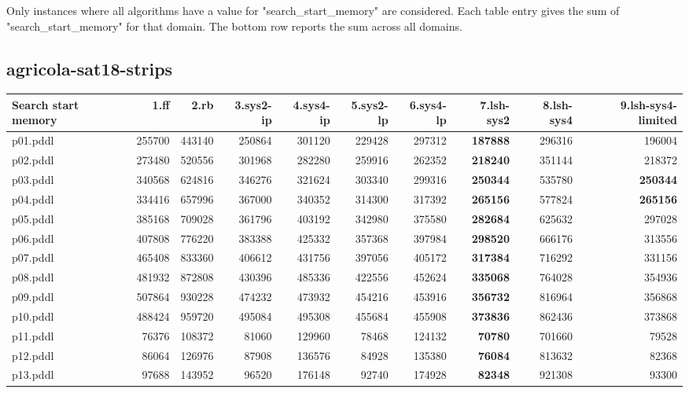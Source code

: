 \documentclass{article}
\begin{document}
Only instances where all algorithms have a value for "search\_start\_memory" are considered. Each table entry gives the sum of "search\_start\_memory" for that domain. The bottom row reports the sum across all domains.

\hypertarget{search_start_memory-agricola-sat18-strips}{}
\subsection*{agricola-sat18-strips}

\begin{tabular}{@{}lrrrrrrrrr@{}}
Search start memory & 1.ff & 2.rb & 3.sys2-ip & 4.sys4-ip & 5.sys2-lp & 6.sys4-lp & 7.lsh-sys2 & 8.lsh-sys4 & 9.lsh-sys4-limited \\
\midrule
p01.pddl & 255700 & 443140 & 250864 & 301120 & 229428 & 297312 & \textbf{187888} & 296316 & 196004 \\
p02.pddl & 273480 & 520556 & 301968 & 282280 & 259916 & 262352 & \textbf{218240} & 351144 & 218372 \\
p03.pddl & 340568 & 624816 & 346276 & 321624 & 303340 & 299316 & \textbf{250344} & 535780 & \textbf{250344} \\
p04.pddl & 334416 & 657996 & 367000 & 340352 & 314300 & 317392 & \textbf{265156} & 577824 & \textbf{265156} \\
p05.pddl & 385168 & 709028 & 361796 & 403192 & 342980 & 375580 & \textbf{282684} & 625632 & 297028 \\
p06.pddl & 407808 & 776220 & 383388 & 425332 & 357368 & 397984 & \textbf{298520} & 666176 & 313556 \\
p07.pddl & 465408 & 833360 & 406612 & 431756 & 397056 & 405172 & \textbf{317384} & 716292 & 331156 \\
p08.pddl & 481932 & 872808 & 430396 & 485336 & 422556 & 452624 & \textbf{335068} & 764028 & 354936 \\
p09.pddl & 507864 & 930228 & 474232 & 473932 & 454216 & 453916 & \textbf{356732} & 816964 & 356868 \\
p10.pddl & 488424 & 959720 & 495084 & 495308 & 455684 & 455908 & \textbf{373836} & 862436 & 373868 \\
p11.pddl & 76376 & 108372 & 81060 & 129960 & 78468 & 124132 & \textbf{70780} & 701660 & 79528 \\
p12.pddl & 86064 & 126976 & 87908 & 136576 & 84928 & 135380 & \textbf{76084} & 813632 & 82368 \\
p13.pddl & 97688 & 143952 & 96520 & 176148 & 92740 & 174928 & \textbf{82348} & 921308 & 93300 \\

\end{tabular}
\end{document}
